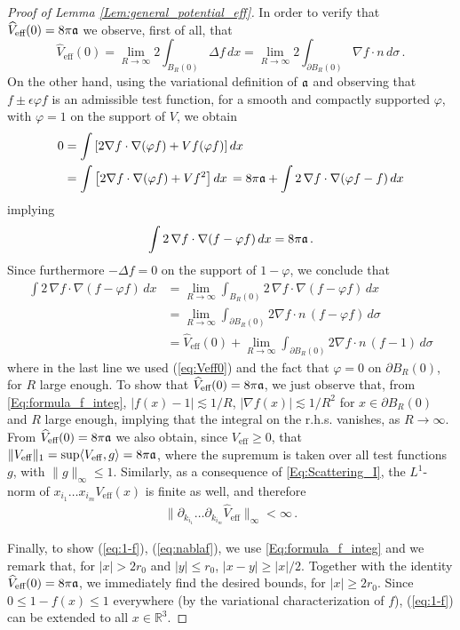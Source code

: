 \documentclass[a4paper,11pt]{article}
\def\bR{\mathbb{R}}
\def\ph{\varphi}
\numberwithin{equation}{section}
\begin{document}
\begin{proof}[Proof of Lemma \ref{Lem:general_potential_eff}]
In order to verify that $\widehat{V}_\text{eff} (0) = 8\pi \frak{a}$ we observe, first of all, that 
\begin{equation}\label{eq:Veff0} \widehat{V}_\text{eff} (0) = \lim_{R \to \infty} 2 \int_{B_R (0)} \Delta f \, dx = \lim_{R \to \infty} 2 \int_{\partial B_R (0)} \nabla f  \cdot n \, d\sigma \, . \end{equation} 
On the other hand, using the variational definition of $\frak{a}$ and observing that $f \pm \epsilon \varphi f$ is an admissible test function, for a smooth and compactly supported $\ph$, with $\ph = 1$ on the support of $V$, we obtain 
\begin{align*}
    0&=\int \left[2 \nabla f \cdot  \nabla (\varphi f)+V f (\varphi f)\right] dx \\ &=\int \left[2 \nabla f \cdot  \nabla (\varphi f)+V f^2\right] dx \, = 8\pi \frak{a} + \int 2 \, \nabla f \cdot \nabla (\ph f - f)  \, dx 
\end{align*}
implying 
\[ \int 2 \, \nabla f \cdot \nabla (f-\ph f) \, dx = 8\pi \frak{a} \, . \]
Since furthermore $-\Delta f=0$ on the support of $1-\varphi$, we conclude that 
\[ \begin{split} \int 2 \, \nabla f \cdot \nabla (f-\ph f) \, dx &= \lim_{R \to \infty} \int_{B_R (0)} 2 \, \nabla f \cdot \nabla (f-\ph f) \, dx \\ &= \lim_{R \to \infty}
\int_{\partial B_R (0)} 2\nabla f \cdot n  \, (f - \ph f)  \, d\sigma \\ &= \widehat{V}_\text{eff} (0) + \lim_{R \to \infty} \int_{\partial B_R (0)}  2\nabla f \cdot n  \, (f-1) \, d\sigma \end{split} \]
where in the last line we used (\ref{eq:Veff0}) and the fact that $\ph =0$ on $\partial B_R (0)$, for $R$ large enough. To show that $\widehat{V}_\text{eff} (0) = 8\pi \frak{a}$, we just observe that, from \eqref{Eq:formula_f_integ}, $|f (x)-1| \lesssim 1/R$, $|\nabla f (x)| \lesssim 1/R^2$ for $x \in \partial B_R (0)$ and $R$ large enough, implying that the integral on the r.h.s. vanishes, as $R \to \infty$. From $\widehat{V}_\text{eff} (0) = 8\pi \frak{a}$ we also obtain, since $V_\mathrm{eff} \geq 0$, that $\| V_\mathrm{eff} \|_1 = \sup \langle V_\mathrm{eff} , g \rangle = 8\pi \frak{a}$, where the supremum is taken over all test functions $g$, with $\| g \|_\infty \leq 1$. Similarly, as a consequence of \eqref{Eq:Scattering_I}, the $L^1$-norm of $x_{i_1}\dots x_{i_m}V_\mathrm{eff}(x)$ is finite as well, and therefore 
\begin{align*}
    \|\partial_{k_{i_1}}\dots \partial_{k_{i_m}} \widehat{V}_\mathrm{eff}\|_\infty < \infty \,.
\end{align*}

Finally, to show (\ref{eq:1-f}), (\ref{eq:nablaf}), we use \eqref{Eq:formula_f_integ} and we remark that, for $|x| > 2 r_0$ and $|y| \leq r_0$, $|x-y| \geq |x|/2$. Together with the identity $\widehat{V}_\text{eff} (0) = 8\pi \frak{a}$, we immediately find the desired bounds, for $|x| \geq 2 r_0$. Since $0 \leq 1- f(x) \leq 1$ everywhere (by the variational characterization of $f$), (\ref{eq:1-f}) can be extended to all $x \in \bR^3$.  
\end{proof}
\end{document}
